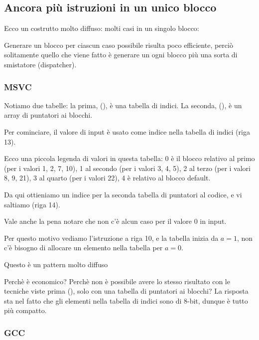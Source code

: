\subsection{Ancora più istruzioni  in un unico blocco}

Ecco un costrutto molto diffuso: molti casi in un singolo blocco:


Generare un blocco per ciascun caso possibile risulta poco efficiente, perciò solitamente quello che viene fatto è generare un
ogni blocco più una sorta di smistatore (dispatcher).

\subsubsection{MSVC}



Notiamo due tabelle: la prima, (), è una tabella di indici. La seconda, (), è un array di puntatori ai blocchi.

Per cominciare, il valore di input è usato come indice nella tabella di indici (riga 13).

Ecco una piccola legenda di valori in questa tabella:
0 è il blocco relativo al primo  (per i valori 1, 2, 7, 10),
1 al secondo (per i valori 3, 4, 5),
2 al terzo (per i valori 8, 9, 21),
3 al quarto (per i valori 22),
4 è relativo al blocco default.

Da qui ottieniamo un indice per la seconda tabella di puntatori al codice, e vi saltiamo (riga 14).

Vale anche la pena notare che non c'è alcun caso per il valore 0 in input.

Per questo motivo vediamo l'istruzione \DEC a riga 10, e la tabella inizia da $a=1$, 
non c'è bisogno di allocare un elemento nella tabella per $a=0$.

Questo è un pattern molto diffuso

Perchè è economico? Perchè non è possibile avere lo stesso risultato con le tecniche viste prima 
(), solo con una tabella di puntatori ai blocchi?
La risposta sta nel fatto che gli elementi nella tabella di indici sono di 8-bit, dunque è tutto più compatto.

\subsubsection{GCC}

